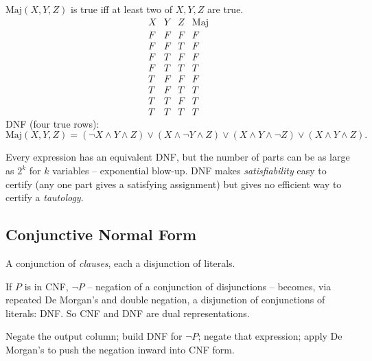 \documentclass[11pt]{article}
\begin{document}
\bigskip
\begin{example}
$\mathrm{Maj}(X,Y,Z)$ is true iff at least two of $X,Y,Z$ are true.
\[
\begin{array}{ccc|c}
X&Y&Z&\mathrm{Maj}\\\hline
F&F&F&F\\ F&F&T&F\\ F&T&F&F\\ F&T&T&T\\
T&F&F&F\\ T&F&T&T\\ T&T&F&T\\ T&T&T&T
\end{array}
\]
DNF (four true rows):
\[
\mathrm{Maj}(X,Y,Z) = (\neg X\wedge Y\wedge Z)\vee(X\wedge\neg Y\wedge Z)\vee(X\wedge Y\wedge \neg Z)\vee(X\wedge Y\wedge Z).
\]
\end{example}

\begin{note}
Every expression has an equivalent DNF, but the number of parts can be as large as $2^k$ for $k$ variables -- exponential blow-up. DNF makes \emph{satisfiability} easy to certify (any one part gives a satisfying assignment) but gives no efficient way to certify a \emph{tautology}.
\end{note}

\subsection{Conjunctive Normal Form}
\label{sec:4-17}

\begin{definition}[CNF]
A conjunction of \emph{clauses}, each a disjunction of literals.
\end{definition}

\begin{note}
If $P$ is in CNF, $\neg P$ -- negation of a conjunction of disjunctions -- becomes, via repeated De Morgan's and double negation, a disjunction of conjunctions of literals: DNF. So CNF and DNF are dual representations.
\end{note}

\begin{note}
Negate the output column; build DNF for $\neg P$; negate that expression; apply De Morgan's to push the negation inward into CNF form.
\end{note}
\end{document}
